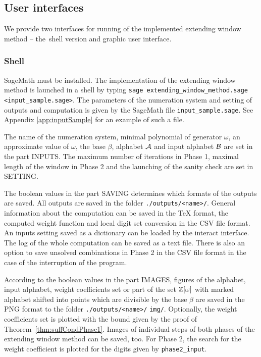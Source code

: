 \begin{upravit}
\subsection*{User interfaces}
We provide two interfaces for running of the implemented extending window method -- the~shell version and graphic user interface.

\subsubsection*{Shell}
SageMath must be installed. The implementation of the extending window method is launched in a shell by typing \verb+sage extending_window_method.sage <input_sample.sage>+. The parameters of the numeration system and setting of outputs and computation is given by the SageMath file \verb+input_sample.sage+. See Appendix \ref{app:inputSample} for an example of such a file.

The name of the numeration system, minimal polynomial of generator $\omega$, an approximate value of $\omega$, the base $\beta$, alphabet $\mathcal{A}$ and input alphabet $\mathcal{B}$ are set in the part INPUTS. The maximum number of iterations in Phase 1, maximal length of the window in Phase 2 and the launching of the sanity check are set in SETTING. 

The boolean values in the part SAVING determines which formats of the outputs are saved. All outputs are saved in the folder \verb+./outputs/<name>/+. General information about the computation can be saved in the TeX format, the computed weight function and local digit set conversion in the CSV file format. An inputs setting saved as a dictionary can be loaded by the interact interface. The log of the whole computation can be saved as a text file. There is also an option to save unsolved combinations in Phase 2 in the CSV file format in the case of the interruption of the program.

According to the boolean values in the part IMAGES, figures of the alphabet, input alphabet, weight coefficients set or part of the set $\mathbb{Z}[\omega]$ with marked alphabet shifted into points which are divisible by the base $\beta$ are saved in the PNG format to the folder \verb+./outputs/<name>/+ \verb+img/+. Optionally, the weight coefficients set is plotted with the  bound given by the proof of Theorem~\ref{thm:suffCondPhase1}. Images of individual steps of both phases of the extending window method can be saved, too. For Phase 2, the search for the weight coefficient  is plotted for the digits given by \verb+phase2_input+.  


\end{upravit}
